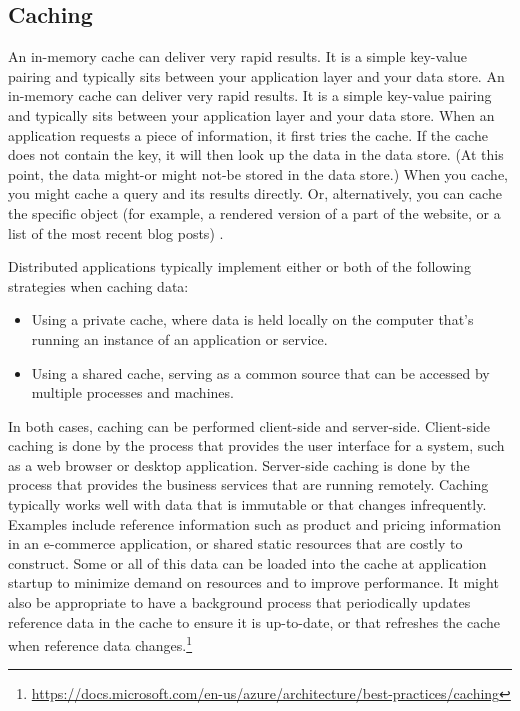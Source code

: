 \documentclass[a4paper, 11.25pt]{article}
\begin{document}
\subsection{Caching}
An in-memory cache can deliver very rapid results. It is a simple key-value pairing and typically sits between your application layer and your data store. An in-memory cache can deliver very rapid results. It is a simple key-value pairing and typically sits between your application layer and your data store. When an application requests a piece of information, it first tries the cache. If the cache does not contain the key, it will then look up the data in the data store. (At this point, the data might-or might not-be stored in the data store.) When you cache, you might cache a query and its results directly. Or, alternatively, you can cache the specific object (for example, a rendered version of a part of the website, or a list of the most recent blog posts) \cite{Cracking2015}.

Distributed applications typically implement either or both of the following strategies when caching data:
\begin{itemize}
    \item Using a private cache, where data is held locally on the computer that's running an instance of an application or service.
    \item Using a shared cache, serving as a common source that can be accessed by multiple processes and machines.
\end{itemize}

In both cases, caching can be performed client-side and server-side. Client-side caching is done by the process that provides the user interface for a system, such as a web browser or desktop application. Server-side caching is done by the process that provides the business services that are running remotely. 
Caching typically works well with data that is immutable or that changes infrequently. Examples include reference information such as product and pricing information in an e-commerce application, or shared static resources that are costly to construct. Some or all of this data can be loaded into the cache at application startup to minimize demand on resources and to improve performance. It might also be appropriate to have a background process that periodically updates reference data in the cache to ensure it is up-to-date, or that refreshes the cache when reference data changes.\footnote{\url{https://docs.microsoft.com/en-us/azure/architecture/best-practices/caching}}
\end{document}
